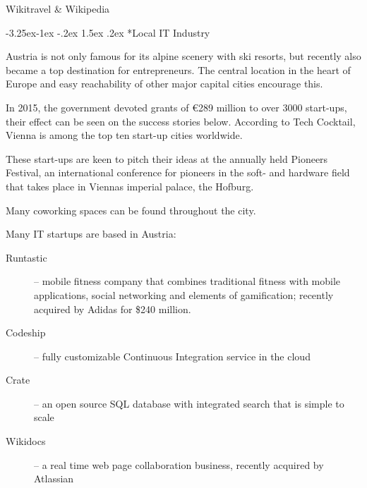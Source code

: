 \documentclass[10pt,a4paper]{article}
\makeatletter
\renewcommand\subsection{%
\@startsection{subsection}{2}{\z@}%
              {-3.25ex\@plus -1ex \@minus -.2ex}%
              {1.5ex \@plus .2ex}%
              {\color{kdelight}\sffamily\Large\bfseries}}
\makeatother
\begin{document}
\begin{flushright}Wikitravel \& Wikipedia\end{flushright}

\subsection*{Local IT Industry}
Austria is not only famous for its alpine scenery with ski resorts, but recently also became a top destination for entrepreneurs. The central location in the heart of Europe and easy reachability of other major capital cities encourage this.

In 2015, the government devoted grants of \euro 289 million to over 3000 start-ups, their effect can be seen on the success stories below. According to Tech Cocktail, Vienna is among the top ten start-up cities worldwide.

These start-ups are keen to pitch their ideas at the annually held Pioneers Festival, an international conference for pioneers in the soft- and hardware field that takes place in Viennas imperial palace, the Hofburg.

Many coworking spaces can be found throughout the city.


Many IT startups are based in Austria:
\begin{description}
	\item[\color{kdedarker} Runtastic]  -- mobile fitness company that combines traditional fitness with mobile applications, social networking and elements of gamification; recently acquired by Adidas for \$240 million.
	\item[\color{kdedarker} Codeship] -- fully customizable Continuous Integration service in the cloud
	\item[\color{kdedarker} Crate] -- an open source SQL database with integrated search that is simple to scale
	\item[\color{kdedarker} Wikidocs] -- a real time web page collaboration business, recently acquired by Atlassian
\end{description}
\end{document}
